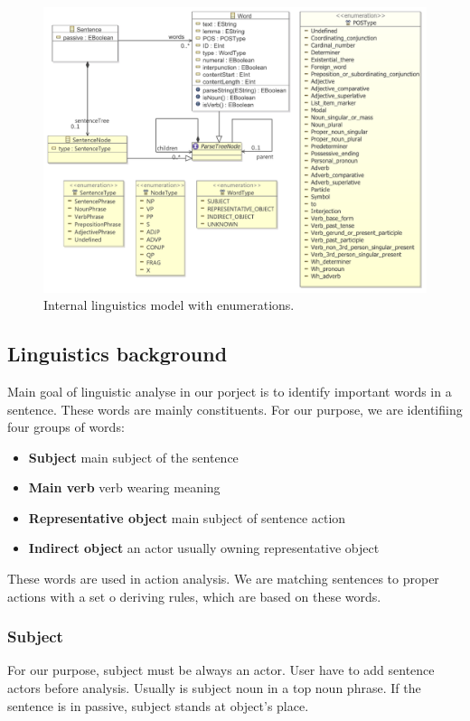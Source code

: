 \begin{figure}[ht]
  \centering
  \includegraphics[width=\textwidth]{images/ReprotoolLingModel}
  \caption{Internal linguistics model with enumerations.}
  \label{fig:ReprotoolLingModel}
\end{figure}

\subsection{Linguistics background}

Main goal of linguistic analyse in our porject is to identify important words in a sentence. These words are mainly constituents. For our purpose, we are identifiing four groups of words:

\begin{itemize}
\item {\bf Subject} main subject of the sentence
\item {\bf Main verb} verb wearing meaning
\item {\bf Representative object} main subject of sentence action
\item {\bf Indirect object} an actor usually owning representative object
\end{itemize}

These words are used in action analysis. We are matching sentences to proper actions with a set o deriving rules, which are based on these words. 
                                                                    
\subsubsection{Subject}
For our purpose, subject must be always an actor. User have to add sentence actors before analysis. Usually is subject noun in a top noun phrase. If the sentence is in passive, subject stands at object's place. 

